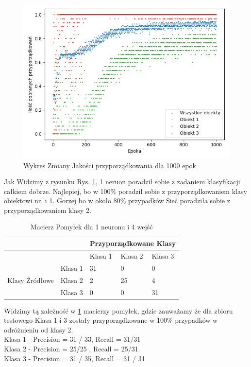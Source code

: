 \documentclass[12pt]{article}
\begin{document}
\begin{figure}[!htb]
 \centering
 \includegraphics[width=12cm]{WykresPrzyporzadkowania1neuron4wejscia.png}
 \caption{Wykres Zmiany Jakości przyporządkowania dla 1000 epok}
 \vspace{-0.1cm}
 \label{WykresPrzyp1}
\end{figure}

Jak Widzimy z rysunku Rys. \ref{WykresPrzyp1}, 1 neruon poradził sobie z zadaniem klasyfikacji całkiem dobrze. Najlepiej, bo w 100\% poradził sobie z przyporządkowaniem klasy obiektowi nr. i 1. Gorzej bo w około 80\% przypadków Sieć poradziła sobie z przyporządkowaniem klasy 2.\\

\begin{table}
\caption{\label{tab:tablica1} Macierz Pomyłek dla 1 neuronu i 4 wejść }
\begin{tabular}{ |p{3cm}|p{3cm}|p{2cm}|p{2cm}|p{2cm}|  }
 \hline
 & & 
 \multicolumn{3}{|c|}{Przyporządkowane Klasy} \\
 \hline

   & & Klasa 1 & Klasa 2 & Klasa 3\\
 \hline
\multirow{3}{4em}{Klasy Źródłowe}
   & Klasa 1 & 31 & 0 & 0 \\ 
   & Klasa 2 & 2 & 25 & 4 \\
   & Klasa 3 & 0 & 0 & 31 \\

 \hline
\end{tabular}
\end{table}
\newpage

Widzimy tą zależność w \ref{tab:tablica1}  macierzy pomyłek, gdzie zauważamy że dla zbioru testowego Klasa 1 i 3 zostały przyporządkowane w 100\% przypadków w odróżnieniu od klasy 2.
\\Klasa 1 - Precision = 31 / 33, Recall = 31/31\\
Klasa 2 - Precision = 25/25 , Recall = 25/31\\
Klasa 3 - Precision = 31 / 35, Recall = 31 / 31\\
\end{document}
